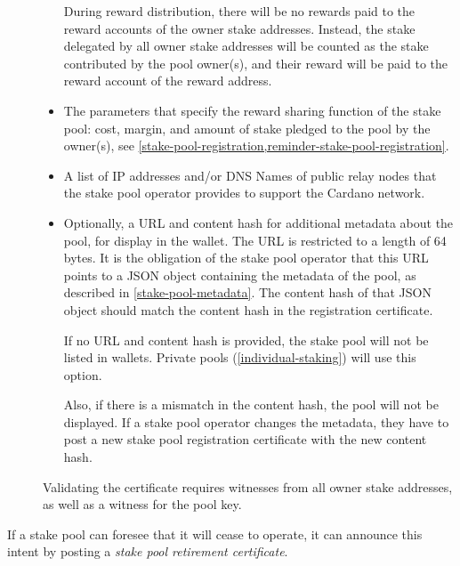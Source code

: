 \documentclass[11pt,a4paper,dvipsnames,twosided]{article}
\begin{document}
\begin{description}
\begin{itemize}
  During reward distribution, there will be no rewards paid to the reward
  accounts of the owner stake addresses. Instead, the stake delegated by all owner
  stake addresses will be counted as the stake contributed by the pool owner(s),
  and their reward will be paid to the reward account of the reward address.

\item
  The parameters that specify the reward sharing function of the stake
  pool: cost, margin, and amount of stake pledged to the pool by the
  owner(s), see \cref{stake-pool-registration,reminder-stake-pool-registration}.

\item
  A list of IP addresses and/or DNS Names of public relay nodes that the stake
  pool operator provides to support the Cardano network.

\item
  Optionally, a URL and content hash for additional metadata about the pool, for
  display in the wallet. The URL is restricted to a length of 64 bytes. It is
  the obligation of the stake pool operator that this URL points to a JSON
  object containing the metadata of the pool, as described in
  \cref{stake-pool-metadata}. The content hash of that JSON object should match
  the content hash in the registration certificate.

  If no URL and content hash is provided, the stake pool will not be listed in
  wallets. Private pools (\cref{individual-staking}) will use this option.

  Also, if there is a mismatch in the content hash, the pool will not be
  displayed. If a stake pool operator changes the metadata, they have to post a
  new stake pool registration certificate with the new content hash.
\end{itemize}

Validating the certificate requires witnesses from all owner stake addresses, as
well as a witness for the pool key.

\end{description}

If a stake pool can foresee that it will cease to operate, it can
announce this intent by posting a \emph{stake pool retirement
certificate}.
\end{document}
